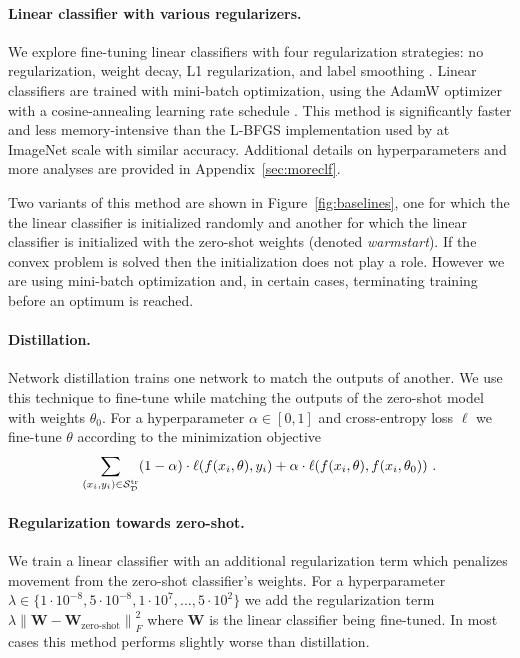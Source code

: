 \paragraph{Linear classifier with various regularizers.} We explore fine-tuning linear classifiers with four regularization strategies: no regularization, weight decay, L1 regularization, and label smoothing \cite{muller2019does}. Linear classifiers are trained with mini-batch optimization, using the AdamW optimizer \cite{loshchilov2018decoupled, paszke2019pytorch} with a cosine-annealing learning rate schedule \cite{loshchilov2016sgdr}.
This method is significantly faster and less memory-intensive than the L-BFGS implementation used by \citet{radford2021learning} at ImageNet scale with similar accuracy.
Additional details on hyperparameters and more analyses are provided in Appendix~\ref{sec:moreclf}. 

Two variants of this method are shown in Figure~\ref{fig:baselines}, one for which the the linear classifier is initialized randomly and another for which the linear classifier is initialized with the zero-shot weights (denoted \emph{warmstart}). If the convex problem is solved then the initialization does not play a role. However we are using mini-batch optimization and, in certain cases, terminating training before an optimum is reached. 


\FloatBarrier

\paragraph{Distillation.} Network distillation \cite{hinton2015distilling} trains one network to match the outputs of another.
We use this technique to fine-tune while matching the outputs of the zero-shot model with weights $\theta_0$.
For a hyperparameter $\alpha \in [0,1]$ and cross-entropy loss $\ell$ we fine-tune $\theta$ according to the minimization  objective
\begin{align} \label{eq:distill}
     \sum_{(x_i, y_i) \in \mathcal{S}^\text{tr}_\mathcal{D}} (1- \alpha) \cdot \ell\mleft(f(x_i,\theta), y_i\mright) + \alpha \cdot \ell\mleft( f(x_i,\theta), f(x_i,\theta_0)\mright)\ .
\end{align}

\paragraph{Regularization towards zero-shot.} We train a linear classifier with an additional regularization term which penalizes movement from the zero-shot classifier's weights.
For a hyperparameter $\lambda \in \{1\cdot10^{-8}, 5\cdot10^{-8}, 1\cdot10^{7},..., 5\cdot10^{2}\}$ we add the regularization term $\lambda \left\| \mathbf{W} - \mathbf{W}_\text{zero-shot} \right\|_F^2$ where $\mathbf{W}$ is the linear classifier being fine-tuned.
In most cases this method performs slightly worse than distillation. 






